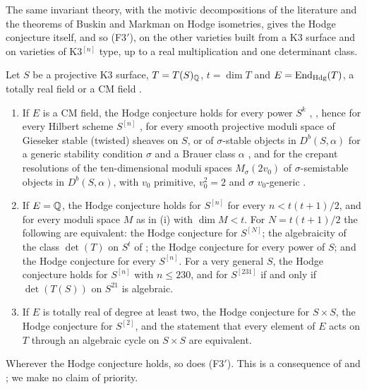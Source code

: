 The same invariant theory, with the motivic decompositions of the
literature and the theorems of Buskin and Markman on Hodge isometries, gives
the Hodge conjecture itself, and so \textup{(F3$'$)}, on the other varieties
built from a K3 surface and on varieties of K3$^{[n]}$ type, up to a real
multiplication and one determinant class.

\begin{proposition}\label{prop:k3powers}
Let $S$ be a projective K3 surface, $T=T(S)_{\mathbb{Q}}$, $t=\dim T$ and
$E=\operatorname{End}_{\mathrm{Hdg}}(T)$, a totally real field or a CM field \cite{Zar83}.
\begin{enumerate}[label=\textup{(\roman*)},leftmargin=2.6em,itemsep=2pt]
\item If $E$ is a CM field, the Hodge conjecture holds for every power
  $S^{k}$ \cite[Theorem~5.4]{RM08}, \cite{Bus19}, hence for every Hilbert
  scheme $S^{[n]}$ \cite{dCM02}, for every smooth projective moduli space of
  Gieseker stable (twisted) sheaves on $S$, or of $\sigma$-stable objects in
  $D^{b}(S,\alpha)$ for a generic stability condition $\sigma$ and a Brauer
  class $\alpha$ \cite[Theorem~0.1, Remark~2.1]{Bue20}, and for the crepant
  resolutions of the ten-dimensional moduli spaces $M_{\sigma}(2v_{0})$ of
  $\sigma$-semistable objects in $D^{b}(S,\alpha)$, with $v_{0}$ primitive,
  $v_{0}^{2}=2$ and $\sigma$ $v_{0}$-generic \cite[Theorem~1.3]{FFZ21}.
\item If $E=\mathbb{Q}$, the Hodge conjecture holds for $S^{[n]}$ for every
  $n<t(t+1)/2$, and for every moduli space $M$ as in \textup{(i)} with
  $\dim M<t$. For $N=t(t+1)/2$ the following are equivalent: the Hodge
  conjecture for $S^{[N]}$; the algebraicity of the class $\det(T)$ on $S^{t}$
  of ; the Hodge conjecture for every power of $S$; and
  the Hodge conjecture for every $S^{[n]}$. For a very general $S$, the Hodge
  conjecture holds for $S^{[n]}$ with $n\le230$, and for $S^{[231]}$ if and
  only if $\det(T(S))$ on $S^{21}$ is algebraic.
\item If $E$ is totally real of degree at least two, the Hodge conjecture for
  $S\times S$, the Hodge conjecture for $S^{[2]}$, and the statement that
  every element of $E$ acts on $T$ through an algebraic cycle on $S\times S$
  are equivalent.
\end{enumerate}
Wherever the Hodge conjecture holds, so does \textup{(F3$'$)}. This is a
consequence of \cite{RM08,Bus19,dCM02,Bue20,FFZ21} and
; we make no claim of priority.
\end{proposition}

